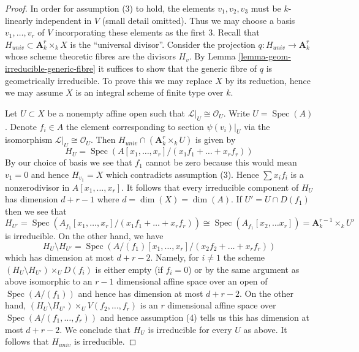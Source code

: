 \documentclass[10pt,a4paper]{amsart}
\theoremstyle{plain}
\theoremstyle{definition}
\theoremstyle{remark}
\numberwithin{equation}{subsection}
\def\Spec{\mathop{\mathrm{Spec}}}
\begin{document}
\begin{proof}
In order for assumption (3) to hold, the elements $v_1, v_2, v_3$
must be $k$-linearly independent in $V$ (small detail omitted).
Thus we may choose a basis $v_1, \ldots, v_r$ of $V$ incorporating
these elements as the first $3$. Recall that
$H_{univ} \subset \mathbf{A}^r_k \times_k X$ is the ``universal divisor''.
Consider the projection $q : H_{univ} \to \mathbf{A}^r_k$
whose scheme theoretic fibres are the divisors $H_v$. By
Lemma \ref{lemma-geom-irreducible-generic-fibre}
it suffices to show that the generic fibre of $q$ is geometrically
irreducible.
To prove this we may replace $X$ by its reduction, hence
we may assume $X$ is an integral scheme of finite type over $k$.

\medskip\noindent
Let $U \subset X$ be a nonempty affine open such that
$\mathcal{L}|_U \cong \mathcal{O}_U$. Write $U = \Spec(A)$.
Denote $f_i \in A$ the element corresponding to section $\psi(v_i)|_U$
via the isomorphism $\mathcal{L}|_U \cong \mathcal{O}_U$.
Then $H_{univ} \cap (\mathbf{A}^r_k \times_k U)$ is given by
$$
H_U = \Spec(A[x_1, \ldots, x_r]/(x_1f_1 + \ldots + x_rf_r))
$$
By our choice of basis we see that $f_1$ cannot be zero because this
would mean $v_1 = 0$ and hence $H_{v_1} = X$ which contradicts
assumption (3). Hence $\sum x_if_i$ is a nonzerodivisor in
$A[x_1, \ldots, x_r]$.
It follows that every irreducible component of $H_U$ has dimension
$d + r - 1$ where $d = \dim(X) = \dim(A)$. If $U' = U \cap D(f_1)$
then we see that
$$
H_{U'} =
\Spec(A_{f_1}[x_1, \ldots, x_r]/(x_1f_1 + \ldots + x_rf_r)) \cong
\Spec(A_{f_1}[x_2, \ldots x_r]) =
\mathbf{A}^{r - 1}_k \times_k U'
$$
is irreducible. On the other hand, we have
$$
H_U \setminus H_{U'} =
\Spec(A/(f_1)[x_1, \ldots, x_r]/(x_2f_2 + \ldots + x_rf_r))
$$
which has dimension at most $d + r - 2$. Namely, for $i \not = 1$
the scheme $(H_U \setminus H_{U'}) \times_U D(f_i)$ is either empty
(if $f_i = 0$) or by the same argument as above isomorphic to an $r - 1$
dimensional affine space over an open of $\Spec(A/(f_1))$ and hence has
dimension at most $d + r - 2$.
On the other hand, $(H_U \setminus H_{U'}) \times_U V(f_2, \ldots, f_r)$
is an $r$ dimensional affine space over $\Spec(A/(f_1, \ldots, f_r))$
and hence assumption (4) tells us this has dimension at most
$d + r - 2$. We conclude that $H_U$ is irreducible for every $U$ as above.
It follows that $H_{univ}$ is irreducible.


\end{proof}
\end{document}
